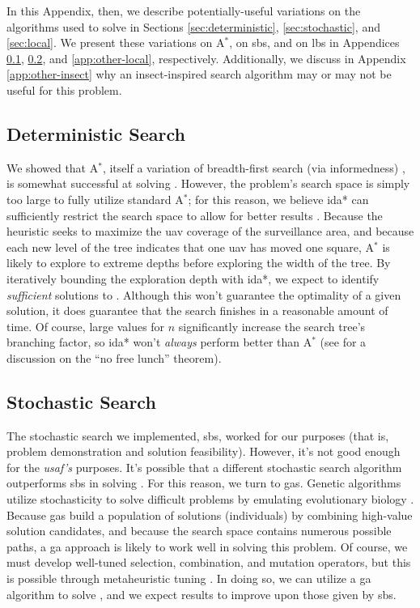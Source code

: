 \documentclass[../main.tex]{subfiles}
\begin{document}
In this Appendix, then, we describe potentially-useful variations on the algorithms used to solve \probs in Sections \ref{sec:deterministic}, \ref{sec:stochastic}, and \ref{sec:local}. We present these variations on A$^*$, on \acl{sbs}, and on \acl{lbs} in Appendices \ref{app:other-deterministic}, \ref{app:other-stochastic}, and \ref{app:other-local}, respectively. Additionally, we discuss in Appendix \ref{app:other-insect} why an insect-inspired search algorithm may or may not be useful for this problem.

\subsection{Deterministic Search}\label{app:other-deterministic}

We showed that A$^*$, itself a variation of breadth-first search (via informedness) \cite{Moore1959, Pearl1984, handout:global-search}, is somewhat successful at solving \prob. However, the problem's search space is simply too large to fully utilize standard A$^*$; for this reason, we believe \ac{ida*} can sufficiently restrict the search space to allow for better results \cite{Korf1985, wikipedia:ida*}. Because the heuristic seeks to maximize the \ac{uav} coverage of the surveillance area, and because each new level of the tree indicates that one \ac{uav} has moved one square, A$^*$ is likely to explore to extreme depths before exploring the width of the tree. By iteratively bounding the exploration depth with \ac{ida*}, we expect to identify \textit{sufficient} solutions to \prob. Although this won't guarantee the optimality of a given solution, it does guarantee that the search finishes in a reasonable amount of time. Of course, large values for $n$ significantly increase the search tree's branching factor, so \ac{ida*} won't \textit{always} perform better than A$^*$ (see \cite{Wolpert1997} for a discussion on the ``no free lunch'' theorem).

\subsection{Stochastic Search}\label{app:other-stochastic}

The stochastic search we implemented, \acl{sbs}, worked for our purposes (that is, problem demonstration and solution feasibility). However, it's not good enough for the \textit{\acl{usaf}'s} purposes. It's possible that a different stochastic search algorithm outperforms \ac{sbs} in solving \prob. For this reason, we turn to \acp{ga}. Genetic algorithms utilize stochasticity to solve difficult problems by emulating evolutionary biology \cite{Lamont2006, Talbi2009}. Because \acp{ga} build a population of solutions (individuals) by combining high-value solution candidates, and because the \probs search space contains numerous possible paths, a \ac{ga} approach is likely to work well in solving this problem. Of course, we must develop well-tuned selection, combination, and mutation operators, but this is possible through metaheuristic tuning \cite{Talbi2009}. In doing so, we can utilize a \ac{ga} algorithm to solve \prob, and we expect results to improve upon those given by \ac{sbs}.
\end{document}
